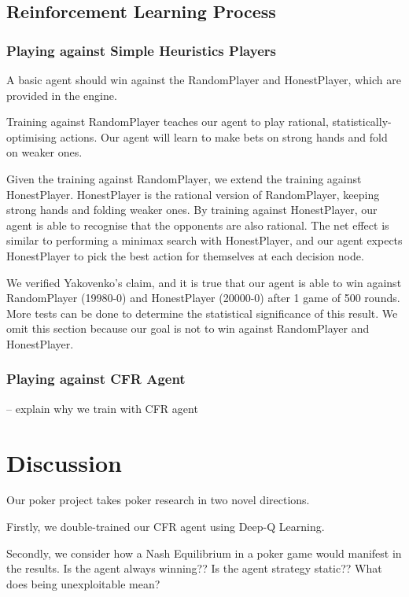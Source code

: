 \documentclass{article}
\begin{document}
\subsection{Reinforcement Learning Process}

\subsubsection{Playing against Simple Heuristics Players}
A basic agent should win against the RandomPlayer and HonestPlayer, which are provided in the engine.

Training against RandomPlayer teaches our agent to play rational, statistically-optimising actions. Our agent will learn to make bets on strong hands and fold on weaker ones. 

Given the training against RandomPlayer, we extend the training against HonestPlayer. HonestPlayer is the rational version of RandomPlayer, keeping strong hands and folding weaker ones. By training against HonestPlayer, our agent is able to recognise that the opponents are also rational. The net effect is similar to performing a minimax search with HonestPlayer, and our agent expects HonestPlayer to pick the best action for themselves at each decision node.

We verified Yakovenko's claim, and it is true that our agent is able to win against RandomPlayer (19980-0) and HonestPlayer (20000-0) after 1 game of 500 rounds. More tests can be done to determine the statistical significance of this result. We omit this section because our goal is not to win against RandomPlayer and HonestPlayer.

\subsubsection{Playing against CFR Agent}

-- explain why we train with CFR agent

\section{Discussion}
Our poker project takes poker research in two novel directions.

Firstly, we double-trained our CFR agent using Deep-Q Learning.

Secondly, we consider how a Nash Equilibrium in a poker game would manifest in the results. Is the agent always winning?? Is the agent strategy static?? What does being unexploitable mean?
\end{document}
